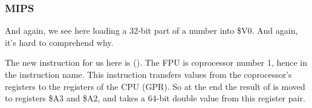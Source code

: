 ﻿\subsubsection{MIPS}



And again, we see here  loading a 32-bit part of a \Tdouble number into \$V0.
And again, it's hard to comprehend why.


The new instruction for us here is  ().
The FPU is coprocessor number 1, hence  in the instruction name.
This instruction transfers values from the coprocessor's registers to the registers of the CPU (\ac{GPR}).
So at the end the result of  is moved to registers \$A3 and \$A2, 
and \printf takes a 64-bit double value from this register pair.

